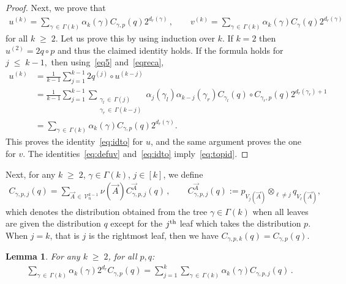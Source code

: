 \documentclass[10pt,a4paper]{article}
\newtheorem{lemm}[theorem]{Lemma}
\renewcommand{\leq}{\;\leqslant\;}
\renewcommand{\geq}{\;\geqslant\;}
\newcommand{\cV}{\mathcal{V}}
\let\g=\gamma
\let\G=\Gamma
\begin{document}
\begin{proof}
Next, we prove that
\begin{align}\label{eq:idto}
u^{(k)}=\sum_{\gamma\,\in\,\Gamma(k)}\alpha_k(\gamma)C_{\gamma,p}(q)2^{d_r(\gamma)}\,,\qquad v^{(k)}=\sum_{\gamma\,\in\,\Gamma(k)}\alpha_k(\gamma)C_{\gamma}(q)2^{d_r(\gamma)}
\end{align}
for all $k \geq 2$. Let us prove this by using induction over $k$. If $k=2$ then $u^{(2)} = 2 q\circ p$ and thus the claimed identity holds. If the formula holds for $j \leq k-1,$ then using~\eqref{eq5} and~\eqref{eqreca},
\begin{align*}
u^{(k)}&=\frac{1}{k-1}\sum_{j=1}^{k-1}2q^{(j)}\circ u^{(k-j)} \\
&=\frac{1}{k-1}\sum_{j=1}^{k-1}\sum_{\substack{\gamma_l\,\in\,\Gamma(j) \\ \gamma_r\,\in\,\Gamma(k-j)}}\alpha_j(\gamma_l)\alpha_{k-j}(\gamma_r) C_{\gamma_l}(q) \circ C_{\gamma_r, p}(q)2^{d_r(\gamma_r)+1} \\
&=\sum_{\gamma\,\in\,\Gamma(k)}\alpha_k(\gamma)C_{\gamma,p}(q)2^{d_r(\gamma)}.
\end{align*}
This proves the identity~\eqref{eq:idto} for $u$, and the same argument proves the one for $v$. The identities~\eqref{eq:defuv} and~\eqref{eq:idto} imply~\eqref{eq:topid}.
\end{proof}

Next, for any $k\geq 2$, $\g\in\G(k)$, $j\in[k]$, we define
\begin{align}\label{eq11}
C_{\gamma,p,j}(q)= \sum_{\vec A\,\in\, \cV_n^{k-1}}\nu(\vec A) C^{\vec A}_{\gamma,p,j}(q)\,,\qquad C^{\vec A}_{\gamma,p,j}(q):= p_{V_j(\vec A)} \otimes _{\ell\neq j} q_{V_\ell(\vec A)},
\end{align}
which denotes the distribution obtained from the tree $\gamma\in\G(k)$ when all leaves are given the distribution $q$ except for the $j^{\rm th}$ leaf which takes the distribution $p$. When $j=k$, that is $j$ is the rightmost leaf, then we have $C_{\gamma,p,k}(q) = C_{\gamma,p}(q)$.

\begin{lemm}\label{lem:dr}
For any $k\geq 2$, for all $p,q$:
\begin{align}\label{eq18}
\sum_{\gamma\,\in\,\Gamma(k)}\alpha_k(\gamma)2^{d_r}C_{\gamma,p}(q) =\sum_{j=1}^k\sum_{\gamma\,\in\,\Gamma(k)}\alpha_k(\gamma)C_{\gamma,p,j}(q)
\,.
\end{align}
\end{lemm}
\end{document}

